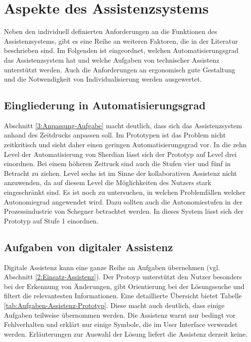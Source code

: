 \section{Aspekte des Assistenzsystems}
Neben den individuell definierten Anforderungen an die Funktionen des Assistenzsystems, gibt es eine Reihe an weiteren Faktoren, die in der Literatur beschrieben sind. Im Folgenden ist eingeordnet, welchen Automatisierungsgrad das Assistenzsystem hat und welche Aufgaben von technischer Assistenz unterstützt werden. Auch die Anforderungen an ergonomisch gute Gestaltung und die Notwendigkeit von Individualisierung werden ausgewertet.

\subsection*{Eingliederung in Automatisierungsgrad}
Abschnitt \ref{3:Anpassung-Aufgabe} macht deutlich, dass sich das Assistenzsystem anhand des Zeitdrucks anpassen soll. Im Prototypen ist das Problem nicht zeitkritisch und sieht daher einen geringen Automatisierungsgrad vor. In die zehn Level der Automatisierung von Sherdian \cite{Wandke2005} lässt sich der Prototyp auf Level drei einordnen. Bei einem höheren Zeitruck sind auch die Stufen vier und fünf in Betracht zu ziehen. Level sechs ist im Sinne der kollaborativen Assistenz nicht anzuwenden, da auf diesem Level die Möglichkeiten des Nutzers stark eingeschränkt sind. Es ist noch zu untersuchen, in welchen Problemfällen welcher Autonomiegrad angewendet wird. Dazu sollten auch die Autonomiestufen in der Prozessindustrie von Schegner \cite{Schegner2017} betrachtet werden. In dieses System lässt sich der Prototyp auf Stufe 1 einordnen.

\subsection*{Aufgaben von digitaler Assistenz}
Digitale Assistenz kann eine ganze Reihe an Aufgaben übernehmen (vgl. Abschnitt \ref{2:Einsatz-Assistenz}). Der Protoyp unterstützt den Nutzer besonders bei der Erkennung von Änderungen, gibt Orientierung bei der Lösungssuche und filtert die relevantesten Informationen. Eine detaillierte Übersicht bietet Tabelle \ref{tab:Aufgaben-Assistenz-Prototyp}. Diese macht auch deutlich, dass einige Aufgaben teilweise übernommen werden. Die Assistenz warnt nur bedingt vor Fehlverhalten und erklärt nur einige Symbole, die im User Interface verwendet werden. Erläuterungen zur Auswahl der Lösung liefert die Assistenz derzeit keine.

